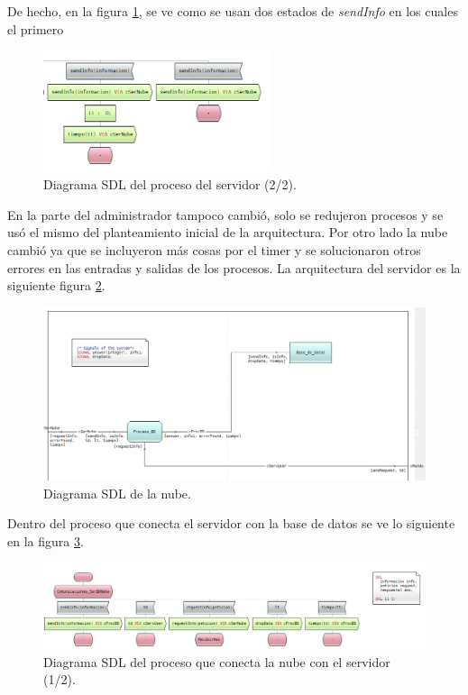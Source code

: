 De hecho, en la figura \ref{ServidorSDL2}, se ve como se usan dos estados de \emph{sendInfo} en los cuales el primero 

\begin{figure}[h]
    \centering
    \includegraphics[width=0.6\textwidth]{images/Proceso_Servidor2x.png}
    \caption{Diagrama SDL del proceso del servidor (2/2).}
    \label{ServidorSDL2}
\end{figure}

\pagebreak

En la parte del administrador tampoco cambió, solo se redujeron procesos y se usó el mismo del planteamiento inicial de la arquitectura. Por otro lado la nube cambió ya que se incluyeron más cosas por el timer y se solucionaron otros errores en las entradas y salidas de los procesos. La arquitectura del servidor es la siguiente figura \ref{Nubex}.

\begin{figure}[h]
    \centering
    \includegraphics[width=1.0\textwidth]{images/Nubex.png}
    \caption{Diagrama SDL de la nube.}
    \label{Nubex}
\end{figure}

Dentro del proceso que conecta el servidor con la base de datos se ve lo siguiente en la figura \ref{ProcesoBD1}.

\begin{figure}[h]
    \centering
    \includegraphics[width=1.0\textwidth]{images/Proceso_BD1x.png}
    \caption{Diagrama SDL del proceso que conecta la nube con el servidor (1/2).}
    \label{ProcesoBD1}
\end{figure}

